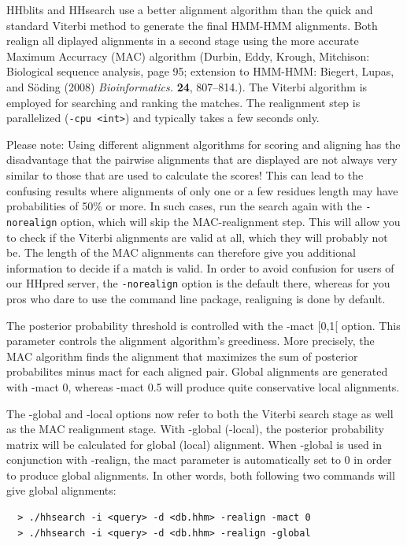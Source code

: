 \documentclass[11pt,a4paper]{article}
\begin{document}
HHblits and HHsearch use a better alignment algorithm than the quick and 
standard Viterbi method to generate the final HMM-HMM alignments. Both realign
all diplayed alignments in a second stage using the more accurate Maximum Accurracy 
(MAC) algorithm (Durbin, Eddy, Krough, Mitchison: Biological sequence analysis, page 
95; extension to HMM-HMM: Biegert, Lupas, and S\"oding (2008) \emph{Bioinformatics.} 
\textbf{24}, 807--814.). The Viterbi algorithm is employed for searching and ranking the 
matches. The realignment step is parallelized (\verb`-cpu <int>`) and typically takes a 
few seconds only.    

Please note: Using different alignment algorithms for scoring and aligning has the 
disadvantage that the pairwise alignments that are displayed are not always very similar to 
those that are used to calculate the scores! This can lead to the confusing results 
where alignments of only one or a few residues length may have probabilities of 50\% 
or more. In such cases, run the search again with the \verb`-norealign` option, which will 
skip the MAC-realignment step. This will allow you to check if the Viterbi alignments 
are valid at all, which they will probably not be. The length of the MAC alignments 
can therefore give you additional information to decide if a match is valid. In order
to avoid confusion for users of our HHpred server, the \verb`-norealign` option is the 
default there, whereas for you pros who dare to use the command line package, 
realigning is done by default.

The posterior probability threshold is controlled with the -mact [0,1[ option. 
This parameter controls the alignment algorithm's greediness. More precisely, the 
MAC algorithm finds the alignment that maximizes the sum of posterior probabilites 
minus mact for each aligned pair. Global alignments are generated with -mact 0, 
whereas -mact 0.5 will produce quite conservative local alignments. 

The -global and -local options now refer to both the Viterbi search stage as 
well as the MAC realignment stage. With -global (-local), the posterior probability 
matrix will be calculated for global (local) alignment. When -global is used in 
conjunction with -realign, the mact parameter is automatically set to 0 in order to 
produce global alignments. In other words, both following two commands will give 
global alignments:
\begin{verbatim}
  > ./hhsearch -i <query> -d <db.hhm> -realign -mact 0
  > ./hhsearch -i <query> -d <db.hhm> -realign -global
\end{verbatim}
\end{document}
